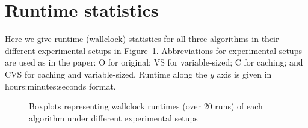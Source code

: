 \section{Runtime statistics}
Here we give runtime (wallclock) statistics for all three algorithms in their different experimental setups in Figure~\ref{fig:wallclock-times}. Abbreviations for experimental setups are used as in the paper: O for original; VS for variable-sized; C for caching; and CVS for caching and variable-sized. Runtime along the $y$ axis is given in hours:minutes:seconds format.




\begin{figure}
\centerline{%
\hfil
{}
\hfil
{}
}
\caption{Boxplots representing wallclock runtimes (over 20 runs) of each algorithm under different experimental setups}
\label{fig:wallclock-times}
\end{figure}